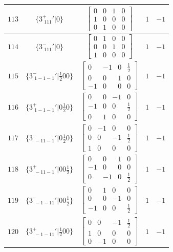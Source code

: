 \documentclass[fleqn,8pt]{jsarticle}
\begin{document}
\begin{longtable}{ccccc}
$ 113 $ & $ \{3^{+}_{\,\,111}{}'|0\} $ & $ \begin{bmatrix} 0 & 0 & 1 & 0 \\ 1 & 0 & 0 & 0 \\ 0 & 1 & 0 & 0 \end{bmatrix} $ & $ 1 $ & $ -1 $ \\ \hline
$ 114 $ & $ \{3^{-}_{\,\,111}{}'|0\} $ & $ \begin{bmatrix} 0 & 1 & 0 & 0 \\ 0 & 0 & 1 & 0 \\ 1 & 0 & 0 & 0 \end{bmatrix} $ & $ 1 $ & $ -1 $ \\ \hline
$ 115 $ & $ \{3^{-}_{\,\,1-1-1}{}'|\frac{1}{2} 0 0\} $ & $ \begin{bmatrix} 0 & -1 & 0 & \frac{1}{2} \\ 0 & 0 & 1 & 0 \\ -1 & 0 & 0 & 0 \end{bmatrix} $ & $ 1 $ & $ -1 $ \\ \hline
$ 116 $ & $ \{3^{+}_{\,\,1-1-1}{}'|0 \frac{1}{2} 0\} $ & $ \begin{bmatrix} 0 & 0 & -1 & 0 \\ -1 & 0 & 0 & \frac{1}{2} \\ 0 & 1 & 0 & 0 \end{bmatrix} $ & $ 1 $ & $ -1 $ \\ \hline
$ 117 $ & $ \{3^{-}_{\,\,-11-1}{}'|0 \frac{1}{2} 0\} $ & $ \begin{bmatrix} 0 & -1 & 0 & 0 \\ 0 & 0 & -1 & \frac{1}{2} \\ 1 & 0 & 0 & 0 \end{bmatrix} $ & $ 1 $ & $ -1 $ \\ \hline
$ 118 $ & $ \{3^{+}_{\,\,-11-1}{}'|0 0 \frac{1}{2}\} $ & $ \begin{bmatrix} 0 & 0 & 1 & 0 \\ -1 & 0 & 0 & 0 \\ 0 & -1 & 0 & \frac{1}{2} \end{bmatrix} $ & $ 1 $ & $ -1 $ \\ \hline
$ 119 $ & $ \{3^{-}_{\,\,-1-11}{}'|0 0 \frac{1}{2}\} $ & $ \begin{bmatrix} 0 & 1 & 0 & 0 \\ 0 & 0 & -1 & 0 \\ -1 & 0 & 0 & \frac{1}{2} \end{bmatrix} $ & $ 1 $ & $ -1 $ \\ \hline
$ 120 $ & $ \{3^{+}_{\,\,-1-11}{}'|\frac{1}{2} 0 0\} $ & $ \begin{bmatrix} 0 & 0 & -1 & \frac{1}{2} \\ 1 & 0 & 0 & 0 \\ 0 & -1 & 0 & 0 \end{bmatrix} $ & $ 1 $ & $ -1 $ \\ \hline

\end{longtable}
\end{document}
